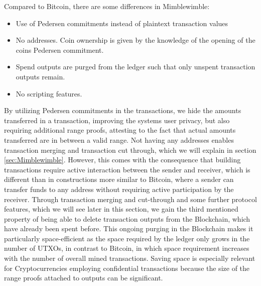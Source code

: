 Compared to Bitcoin, there are some differences in Mimblewimble:
\begin{itemize}
    \item Use of Pedersen commitments instead of plaintext transaction values 
    \item No addresses. Coin ownership is given by the knowledge of the opening of the coins Pedersen commitment. 
    \item Spend outputs are purged from the ledger such that only unspent transaction outputs remain.
    \item No scripting features.
\end{itemize}


By utilizing Pedersen commitments in the transactions, we  hide the amounts transferred in a transaction,
improving the systems user privacy, but also requiring additional range proofs, attesting to the fact that actual amounts transferred are in between a valid range. 
Not having any addresses enables transaction merging and transaction cut through,  which we will explain in section \ref{sec:Mimblewimble}.
However, this comes with the consequence that building transactions require active interaction between the sender and receiver,
which is different than in constructions more similar to Bitcoin, where a sender can transfer funds to any address without requiring active participation by the receiver. 
Through transaction merging and cut-through and some further protocol features, which we will see later in this section, we gain the third mentioned property of being able
to delete transaction outputs from the Blockchain, which have already been spent before. This ongoing purging in the Blockchain makes it particularly space-efficient as the
space required by the ledger only grows in the number of UTXOs, in contrast to Bitcoin, in which space requirement increases with the number of overall mined transactions.
Saving space is especially relevant for Cryptocurrencies employing confidential transactions because the size of the range proofs attached to outputs can be significant.

